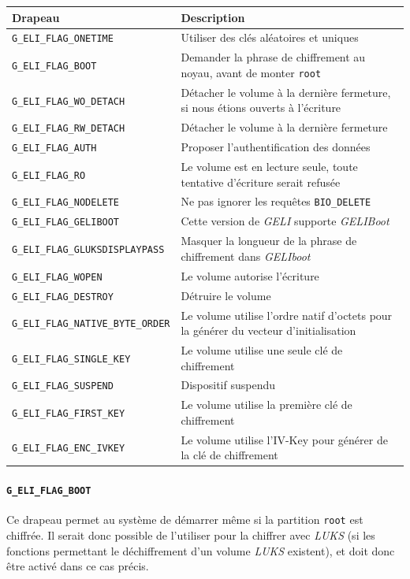 \begin{tabularx}{\linewidth}{ | l | X | }
  \hline
  \textbf{Drapeau}                            & \textbf{Description} \\
  \hline
  \texttt{G\_ELI\_FLAG\_ONETIME}             & Utiliser des clés aléatoires et
  uniques \\
  \texttt{G\_ELI\_FLAG\_BOOT}                & Demander la phrase de
  chiffrement au noyau, avant de monter \texttt{root} \\
  \texttt{G\_ELI\_FLAG\_WO\_DETACH}          & Détacher le volume à la dernière
  fermeture, si nous étions ouverts à l'écriture \\
  \texttt{G\_ELI\_FLAG\_RW\_DETACH}          & Détacher le volume à la dernière
  fermeture \\
  \texttt{G\_ELI\_FLAG\_AUTH}                & Proposer l'authentification des
  données \\
  \texttt{G\_ELI\_FLAG\_RO}                  & Le volume est en lecture seule,
  toute tentative d'écriture serait refusée \\
  \texttt{G\_ELI\_FLAG\_NODELETE}            & Ne pas ignorer les requêtes
  \texttt{BIO\_DELETE} \\
  \texttt{G\_ELI\_FLAG\_GELIBOOT}           & Cette version de \textit{GELI}
  supporte \textit{GELIBoot} \\
  \texttt{G\_ELI\_FLAG\_GLUKSDISPLAYPASS}    & Masquer la longueur de la phrase
  de chiffrement dans \textit{GELIboot} \\
  \texttt{G\_ELI\_FLAG\_WOPEN}               & Le volume autorise l'écriture \\
  \texttt{G\_ELI\_FLAG\_DESTROY}             & Détruire le volume \\
  \texttt{G\_ELI\_FLAG\_NATIVE\_BYTE\_ORDER} & Le volume utilise l'ordre natif
  d'octets pour la générer du vecteur d'initialisation \\
  \texttt{G\_ELI\_FLAG\_SINGLE\_KEY}         & Le volume utilise une seule clé
  de chiffrement \\
  \texttt{G\_ELI\_FLAG\_SUSPEND}             & Dispositif suspendu \\
  \texttt{G\_ELI\_FLAG\_FIRST\_KEY}          & Le volume utilise la première
  clé de chiffrement \\
  \texttt{G\_ELI\_FLAG\_ENC\_IVKEY}          & Le volume utilise l'IV-Key pour
  générer de la clé de chiffrement \\
  \hline
\end{tabularx}
\paragraph{\texttt{G\_ELI\_FLAG\_BOOT}}
Ce drapeau permet au système de démarrer même si la partition \texttt{root} est
chiffrée. Il serait donc possible de l'utiliser pour la chiffrer avec
\textit{LUKS} (si les fonctions permettant le déchiffrement d'un volume
\textit{LUKS} existent), et doit donc être activé dans ce cas précis.
